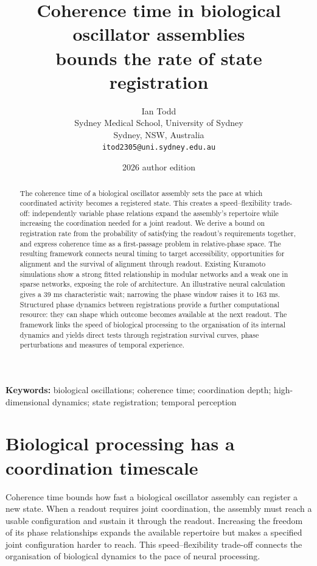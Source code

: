 \documentclass[11pt]{article}
\title{Coherence time in biological oscillator assemblies\\
bounds the rate of state registration}
\author{Ian Todd\\
Sydney Medical School, University of Sydney\\
Sydney, NSW, Australia\\
\texttt{itod2305@uni.sydney.edu.au}}
\date{2026 author edition}
\begin{document}
\maketitle

\begin{abstract}
The coherence time of a biological oscillator assembly sets the pace at
which coordinated activity becomes a registered state. This creates a
speed--flexibility trade-off: independently variable phase relations expand
the assembly's repertoire while increasing the coordination needed for a
joint readout. We derive a bound on registration rate from the probability
of satisfying the readout's requirements together, and express coherence
time as a first-passage problem in relative-phase space. The resulting
framework connects neural timing to target accessibility, opportunities
for alignment and the survival of alignment through readout. Existing
Kuramoto simulations show a strong fitted relationship in modular networks
and a weak one in sparse networks, exposing the role of architecture.
An illustrative neural calculation gives a 39 ms characteristic wait;
narrowing the phase window raises it to 163 ms. Structured phase dynamics
between registrations provide a further computational resource: they can
shape which outcome becomes available at the next readout. The framework
links the speed of biological processing to the organisation of its
internal dynamics and yields direct tests through registration survival
curves, phase perturbations and measures of temporal experience.

\end{abstract}

\noindent\textbf{Keywords:} biological oscillations; coherence time; coordination
depth; high-dimensional dynamics; state registration; temporal perception

\medskip
{}

\section{Biological processing has a coordination timescale}

Coherence time bounds how fast a biological oscillator assembly can
register a new state. When a readout requires joint coordination, the
assembly must reach a usable configuration and sustain it through the
readout. Increasing the freedom of its phase relationships expands the
available repertoire but makes a specified joint configuration harder to
reach. This speed--flexibility trade-off connects the organisation of
biological dynamics to the pace of neural processing.
\end{document}
